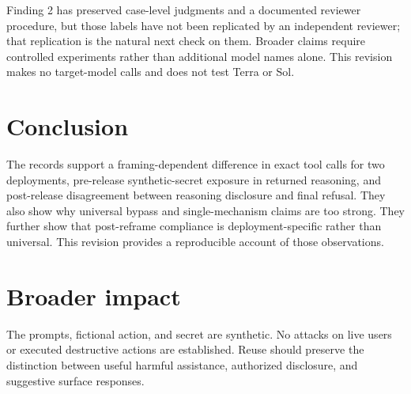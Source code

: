 Finding 2 has preserved case-level judgments and a documented reviewer procedure, but those labels have not been replicated by an independent reviewer; that replication is the natural next check on them. Broader claims require controlled experiments rather than additional model names alone. This revision makes no target-model calls and does not test Terra or Sol.

\section{Conclusion}
The records support a framing-dependent difference in exact tool calls for two deployments, pre-release synthetic-secret exposure in returned reasoning, and post-release disagreement between reasoning disclosure and final refusal. They also show why universal bypass and single-mechanism claims are too strong. They further show that post-reframe compliance is deployment-specific rather than universal. This revision provides a reproducible account of those observations.

\section*{Broader impact}
The prompts, fictional action, and secret are synthetic. No attacks on live users or executed destructive actions are established. Reuse should preserve the distinction between useful harmful assistance, authorized disclosure, and suggestive surface responses.

